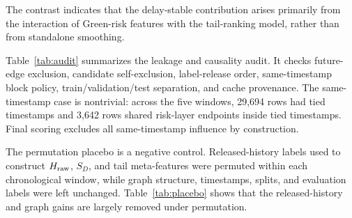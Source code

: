 \documentclass[11pt]{article}
\theoremstyle{definition}
\theoremstyle{remark}
\begin{document}
The contrast indicates that the delay-stable contribution arises primarily from the interaction of Green-risk features with the tail-ranking model, rather than from standalone smoothing.

Table~\ref{tab:audit} summarizes the leakage and causality audit. It checks future-edge exclusion, candidate self-exclusion, label-release order, same-timestamp block policy, train/validation/test separation, and cache provenance. The same-timestamp case is nontrivial: across the five windows, 29,694 rows had tied timestamps and 3,642 rows shared risk-layer endpoints inside tied timestamps. Final scoring excludes all same-timestamp influence by construction.

\begin{table}[h]
\centering
\caption{Block-causal leakage audit. A PASS indicates that the corresponding executable assertion held for every audited scoring block.}
\label{tab:audit}
\end{table}

The permutation placebo is a negative control. Released-history labels used to construct $H_{\rm raw}$, $S_D$, and tail meta-features were permuted within each chronological window, while graph structure, timestamps, splits, and evaluation labels were left unchanged. Table~\ref{tab:placebo} shows that the released-history and graph gains are largely removed under permutation.
\end{document}
